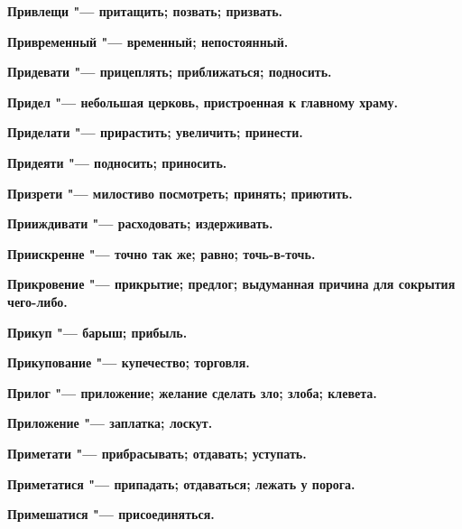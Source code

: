\begin{multicols}{2}
\bfseries Привлещи\normalfont{} "--- притащить; позвать; призвать. 




\bfseries Привременный\normalfont{} "--- временный; непостоянный. 




\bfseries Придевати\normalfont{} "--- прицеплять; приближаться; подносить. 




\bfseries Придел\normalfont{} "--- небольшая церковь, пристроенная к главному храму. 




\bfseries Приделати\normalfont{} "--- прирастить; увеличить; принести. 




\bfseries Придеяти\normalfont{} "--- подносить; приносить. 




\bfseries Призрети\normalfont{} "--- милостиво посмотреть; принять; приютить. 




\bfseries Прииждивати\normalfont{} "--- расходовать; издерживать. 




\bfseries Приискренне\normalfont{} "--- точно так же; равно; точь-в-точь. 




\bfseries Прикровение\normalfont{} "--- прикрытие; предлог; выдуманная причина для сокрытия чего-либо. 




\bfseries Прикуп\normalfont{} "--- барыш; прибыль. 




\bfseries Прикупование\normalfont{} "--- купечество; торговля. 




\bfseries Прилог\normalfont{} "--- приложение; желание сделать зло; злоба; клевета. 




\bfseries Приложение\normalfont{} "--- заплатка; лоскут. 




\bfseries Приметати\normalfont{} "--- прибрасывать; отдавать; уступать. 




\bfseries Приметатися\normalfont{} "--- припадать; отдаваться; лежать у порога. 




\bfseries Примешатися\normalfont{} "--- присоединяться. 





\end{multicols}
